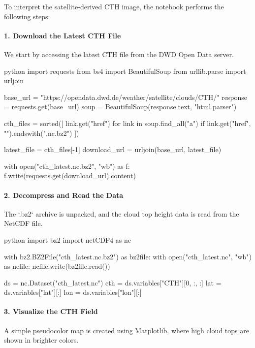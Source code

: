To interpret the satellite-derived CTH image, the notebook performs the following steps:

\paragraph{1. Download the Latest CTH File}

We start by accessing the latest CTH file from the DWD Open Data server.

\begin{codeonly}{python}
import requests
from bs4 import BeautifulSoup
from urllib.parse import urljoin

base_url = "https://opendata.dwd.de/weather/satellite/clouds/CTH/"
response = requests.get(base_url)
soup = BeautifulSoup(response.text, "html.parser")

cth_files = sorted([
    link.get("href") for link in soup.find_all("a")
    if link.get("href", "").endswith(".nc.bz2")
])

latest_file = cth_files[-1]
download_url = urljoin(base_url, latest_file)

with open("cth_latest.nc.bz2", "wb") as f:
    f.write(requests.get(download_url).content)
\end{codeonly}

\paragraph{2. Decompress and Read the Data}

The `.bz2` archive is unpacked, and the cloud top height data is read from the NetCDF file.

\begin{codeonly}{python}
import bz2
import netCDF4 as nc

with bz2.BZ2File("cth_latest.nc.bz2") as bz2file:
    with open("cth_latest.nc", "wb") as ncfile:
        ncfile.write(bz2file.read())

ds = nc.Dataset("cth_latest.nc")
cth = ds.variables["CTH"][0, :, :]
lat = ds.variables["lat"][:]
lon = ds.variables["lon"][:]
\end{codeonly}

\paragraph{3. Visualize the CTH Field}

A simple pseudocolor map is created using Matplotlib, where high cloud tops are shown in brighter colors.

